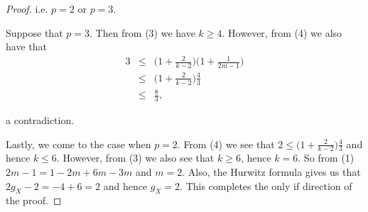 \documentclass[11pt]{article} %
\begin{document}
\begin{proof}
i.e. $p=2$ or $p=3$. 

Suppose that $p=3$. Then from (3) we have $k\geq 4$. However, from (4) we also have that 
	\begin{eqnarray*}
		3 & \leq &\Big( 1+\frac{2}{k-2} \Big) \Big(1+\frac{1}{2m-1} \Big)\\
		& \leq & \Big( 1+\frac{2}{k-2} \Big) \frac{4}{3}\\
		& \leq & \frac{8}{3},
	\end{eqnarray*}

a contradiction.

Lastly, we come to the case when $p=2$. From (4) we see that $2\leq \Big(1+\frac{2}{k-2}\Big)\frac{4}{3}$ and hence $k\leq 6$. However, from (3) we also see that $k\geq 6$, hence $k=6$. So from (1) $2m-1=1-2m+6m-3m$ and $m=2$. Also, the Hurwitz formula gives us that $2g_X-2=-4+6=2$ and hence $g_X=2$. This completes the only if direction of the proof.
\end{proof}



\end{document}

